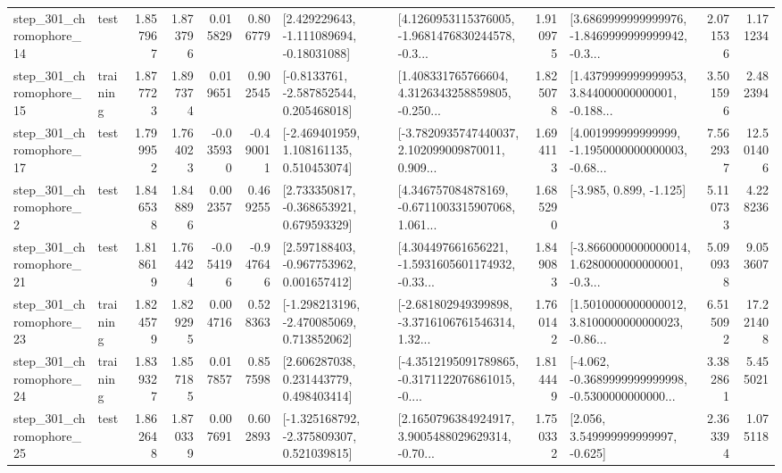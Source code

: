 \begin{tabular}{llrrrrllrlrr}
  step\_301\_chromophore\_14 &      test &      1.857967 &    1.873796 &      0.015829 &  0.806779 &    [2.429229643, -1.111089694, -0.18031088] &  [4.1260953115376005, -1.9681476830244578, -0.3... &       1.910975 &  [3.6869999999999976, -1.8469999999999942, -0.3... &            2.071536 &          1.171234 \\
  step\_301\_chromophore\_15 &  training &      1.877723 &    1.897374 &      0.019651 &  0.902545 &     [-0.8133761, -2.587852544, 0.205468018] &  [1.408331765766604, 4.3126343258859805, -0.250... &       1.825078 &  [1.4379999999999953, 3.844000000000001, -0.188... &            3.501596 &          2.482394 \\
  step\_301\_chromophore\_17 &      test &      1.799952 &    1.764023 &     -0.035930 & -0.490011 &    [-2.469401959, 1.108161135, 0.510453074] &  [-3.7820935747440037, 2.102099009870011, 0.909... &       1.694113 &  [4.001999999999999, -1.1950000000000003, -0.68... &            7.562937 &         12.501406 \\
   step\_301\_chromophore\_2 &      test &      1.846538 &    1.848896 &      0.002357 &  0.469255 &    [2.733350817, -0.368653921, 0.679593329] &  [4.346757084878169, -0.6711003315907068, 1.061... &       1.685290 &                            [-3.985, 0.899, -1.125] &            5.110733 &          4.228236 \\
  step\_301\_chromophore\_21 &      test &      1.818619 &    1.764424 &     -0.054196 & -0.947646 &    [2.597188403, -0.967753962, 0.001657412] &  [4.304497661656221, -1.5931605601174932, -0.33... &       1.849083 &  [-3.8660000000000014, 1.6280000000000001, -0.3... &            5.090938 &          9.053607 \\
  step\_301\_chromophore\_23 &  training &      1.824579 &    1.829295 &      0.004716 &  0.528363 &   [-1.298213196, -2.470085069, 0.713852062] &  [-2.681802949399898, -3.3716106761546314, 1.32... &       1.760142 &  [1.5010000000000012, 3.8100000000000023, -0.86... &            6.515092 &         17.221408 \\
  step\_301\_chromophore\_24 &  training &      1.839327 &    1.857185 &      0.017857 &  0.857598 &     [2.606287038, 0.231443779, 0.498403414] &  [-4.3512195091789865, -0.3171122076861015, -0.... &       1.814449 &  [-4.062, -0.3689999999999998, -0.5300000000000... &            3.382861 &          5.455021 \\
  step\_301\_chromophore\_25 &      test &      1.862648 &    1.870339 &      0.007691 &  0.602893 &   [-1.325168792, -2.375809307, 0.521039815] &  [2.1650796384924917, 3.9005488029629314, -0.70... &       1.750332 &                 [2.056, 3.549999999999997, -0.625] &            2.363394 &          1.075118 \\

\end{tabular}
